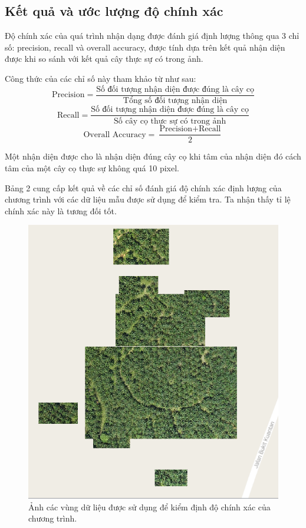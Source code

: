 \documentclass[14pt, oneside, a4paper, openany]{scrartcl}
\begin{document}
\subsection{Kết quả và ước lượng độ chính xác}
Độ chính xác của quá trình nhận dạng được đánh giá định lượng thông qua 3 chỉ số: precision, recall và overall accuracy, được tính dựa trên kết quả nhận diện được khi so sánh với kết quả cây thực sự có trong ảnh.

Công thức của các chỉ số này tham khảo từ \cite{deeptree} như sau:
\begin{equation}
	\text{Precision} = \frac{\text{Số đối tượng nhận diện được đúng là cây cọ}}{\text{Tổng số đối tượng nhận diện}}
\end{equation}
\begin{equation}
	\text{Recall} = \frac{\text{Số đối tượng nhận diện được đúng là cây cọ}}{\text{Số cây cọ thực sự có trong ảnh}}
\end{equation}
\begin{equation}
	\text{Overall Accuracy} = \frac{\text{Precision} + \text{Recall}}{2}
\end{equation}

Một nhận diện được cho là nhận diện đúng cây cọ khi tâm của nhận diện đó cách tâm của một cây cọ thực sự không quá 10 pixel.

Bảng 2 cung cấp kết quả về các chỉ số đánh giá độ chính xác định lượng của chương trình với các dữ liệu mẫu được sử dụng để kiểm tra.
Ta nhận thấy tỉ lệ chính xác này là tương đối tốt.

\begin{figure}[!h]
	\centering
	\includegraphics[scale=0.6]{figures/testRegion.png}
	\caption[Ảnh các vùng dữ liệu được sử dụng để kiểm định độ chính xác của chương trình]{Ảnh các vùng dữ liệu được sử dụng để kiểm định độ chính xác của chương trình.}
\end{figure}
\end{document}
